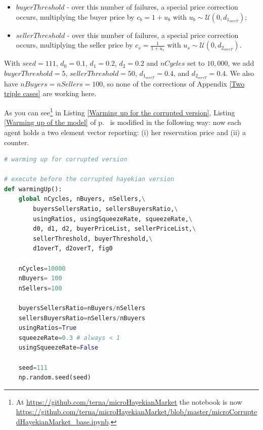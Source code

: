 \documentclass[10pt]{report}
\begin{document}
\begin{appendices}
\begin{itemize}

\item $buyerThreshold$ - over this number of failures, a special price correction occurs, multiplying the buyer price by $c_b=1 + u_b$ with $u_b\sim\mathcal{U}(0,d_{1_{overT}})$;

\item $sellerThreshold$ - over this number of failures, a special price correction occurs, multiplying the seller price by $c_s=\frac{1} {1 + u_s}$ with $u_s\sim\mathcal{U}(0,d_{2_{overT}})$.

\end{itemize}

With $seed=111$,  $d_0=0.1$, $d_1=0.2$, $d_2=0.2$ and $nCycles$ set to $10,000$, we add $buyerThreshold=5$,  $sellerThreshold=50$, $d_{1_{overT}}=0.4$, and $d_{2_{overT}}=0.4$. We also have $nBuyers=nSellers=100$, so none of the corrections of Appendix \ref{Two triple cases} are working here.

As you can see\footnote{At \url{https://github.com/terna/microHayekianMarket} the notebook is now \url{https://github.com/terna/microHayekianMarket/blob/master/microCorruptedHayekianMarket_base.ipynb}.} in Listing \ref{Warming up for the corrupted version}, Listing \ref{Warming up of the model} of p.~\pageref{Warming up of the model} is modified in the following way: now each agent holds a two element vector reporting: (i) her reservation price and (ii) a counter.


\begin{lstlisting}[language=Python, caption=Warming up for the corrupted version of the model, 
label={Warming up for the corrupted version},basicstyle=\ttfamily\footnotesize]
# warming up for corrupted version

# execute before the corrupted hayekian version
def warmingUp():
    global nCycles, nBuyers, nSellers,\
        buyersSellersRatio, sellersBuyersRatio,\
        usingRatios, usingSqueezeRate, squeezeRate,\
        d0, d1, d2, buyerPriceList, sellerPriceList,\
        sellerThreshold, buyerThreshold,\
        d1overT, d2overT, fig0

    nCycles=10000
    nBuyers= 100
    nSellers=100

    buyersSellersRatio=nBuyers/nSellers
    sellersBuyersRatio=nSellers/nBuyers
    usingRatios=True
    squeezeRate=0.3 # always < 1 
    usingSqueezeRate=False

    seed=111
    np.random.seed(seed)


\end{lstlisting}
\end{appendices}
\end{document}
